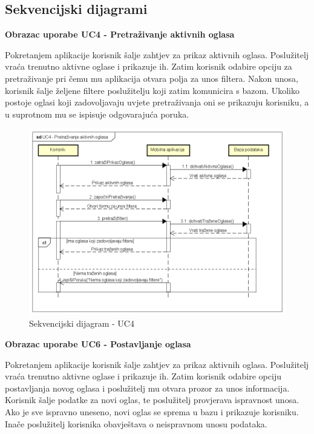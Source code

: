 					\eject
				\eject		
				
			\subsection{Sekvencijski dijagrami}
				
				\textbf{Obrazac uporabe UC4 - Pretraživanje aktivnih oglasa}

				Pokretanjem aplikacije korisnik šalje zahtjev za prikaz aktivnih oglasa. Poslužitelj vraća trenutno aktivne oglase i prikazuje ih. Zatim korisnik odabire opciju za pretraživanje pri čemu mu aplikacija otvara polja za unos filtera. Nakon unosa, korisnik šalje željene filtere poslužitelju koji zatim komunicira s bazom. Ukoliko postoje oglasi koji zadovoljavaju uvjete pretraživanja oni se prikazuju korisniku, a u suprotnom mu se ispisuje odgovarajuća poruka.

					\begin{figure}[H]
						\includegraphics[scale=0.65]{dijagrami/sekvencijskiDijagrami/sd4} %
						\centering
						\caption{Sekvencijski dijagram - UC4}
						\label{fig:sDijagram4}
					\end{figure}

				\textbf{Obrazac uporabe UC6 - Postavljanje oglasa}

				Pokretanjem aplikacije korisnik šalje zahtjev za prikaz aktivnih oglasa. Poslužitelj vraća trenutno aktivne oglase i prikazuje ih. Zatim korisnik odabire opciju postavljanja novog oglasa i poslužitelj mu otvara prozor za unos informacija. Korisnik šalje podatke za novi oglas, te poslužitelj provjerava ispravnost unosa. Ako je sve ispravno uneseno, novi oglas se sprema u bazu i prikazuje korisniku. Inače poslužitelj korisnika obavještava o neispravnom unosu podataka.

